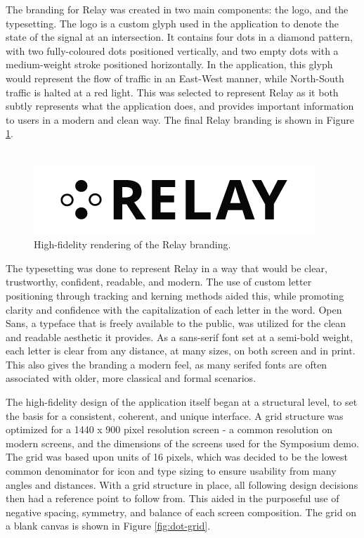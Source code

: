 \documentclass{report}
\begin{document}
The branding for Relay was created in two main components: the logo, and the typesetting.
The logo is a custom glyph used in the application to denote the state of the signal at an intersection.
It contains four dots in a diamond pattern, with two fully-coloured dots positioned vertically, and two empty dots with a medium-weight stroke positioned horizontally.
In the application, this glyph would represent the flow of traffic in an East-West manner, while North-South traffic is halted at a red light.
This was selected to represent Relay as it both subtly represents what the application does, and provides important information to users in a modern and clean way.
The final Relay branding is shown in Figure \ref{fig:relay-logo}. \\ \\

\begin{figure}[htbp!]
  \begin{centering}
    \includegraphics[scale=0.7]{figures/relay-logo.png}
    \caption{High-fidelity rendering of the Relay branding.}
    \label{fig:relay-logo}
  \end{centering}
\end{figure}

The typesetting was done to represent Relay in a way that would be clear, trustworthy, confident, readable, and modern.
The use of custom letter positioning through tracking and kerning methods aided this, while promoting clarity and confidence with the capitalization of each letter in the word.
Open Sans, a typeface that is freely available to the public, was utilized for the clean and readable aesthetic it provides.
As a sans-serif font set at a semi-bold weight, each letter is clear from any distance, at many sizes, on both screen and in print.
This also gives the branding a modern feel, as many serifed fonts are often associated with older, more classical and formal scenarios.

The high-fidelity design of the application itself began at a structural level, to set the basis for a consistent, coherent, and unique interface.
A grid structure was optimized for a 1440 x 900 pixel resolution screen - a common resolution on modern screens, and the dimensions of the screens used for the Symposium demo.
The grid was based upon units of 16 pixels, which was decided to be the lowest common denominator for icon and type sizing to ensure usability from many angles and distances.
With a grid structure in place, all following design decisions then had a reference point to follow from.
This aided in the purposeful use of negative spacing, symmetry, and balance of each screen composition.
The grid on a blank canvas is shown in Figure \ref{fig:dot-grid}. \\
\end{document}
